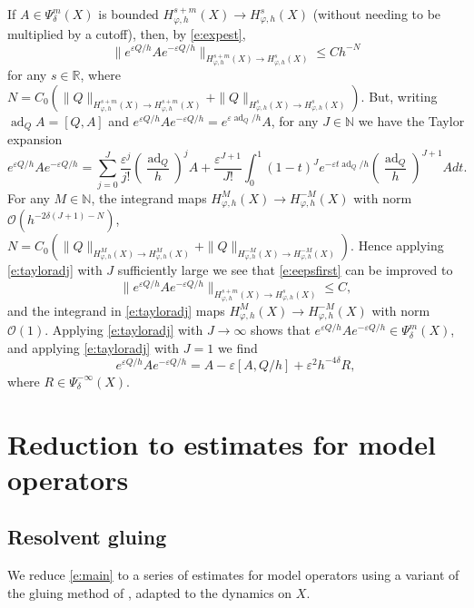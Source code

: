 \documentclass[reqno, 12pt]{amsart}
\newcommand \N {\mathbb{N}}
\newcommand \R {\mathbb{R}}
\newcommand \Oh {\mathcal{O}}
\newcommand \eps {\varepsilon}
\DeclareMathOperator \ad {ad}
\theoremstyle{definition}
\numberwithin{equation}{section}
\numberwithin{prop}{section}
\numberwithin{figure}{section}
\begin{document}
If $A \in \Psi_\delta^{m}(X)$ is bounded $H^{s+m}_{\varphi,h}(X) \to H^s_{\varphi,h}(X)$ (without needing to be multiplied by a cutoff), then, by \eqref{e:expest}, 
\begin{equation}\label{e:eepsfirst}
\|e^{\eps Q/h}A e^{-\eps Q/h}\|_{H^{s+m}_{\varphi,h}(X) \to H^s_{\varphi,h}(X)} \le C h^{-N}
\end{equation}
 for any $s \in \R$, where $N = C_0(\|Q\|_{H^{s+m}_{\varphi,h}(X) \to H^{s+m}_{\varphi,h}(X)} + \|Q\|_{H^s_{\varphi,h}(X) \to H^s_{\varphi,h}(X)})$. But, writing $\ad_Q A = [Q,A]$ and $e^{\eps Q/h}A e^{-\eps Q/h} = e^{\eps \ad_{Q}/h}A$, for any $J \in \N$ we have the Taylor expansion
\begin{equation}\label{e:tayloradj}
e^{\eps Q/h}A e^{-\eps Q/h} = \sum_{j=0}^J \frac {\eps^j}{j!} \left(\frac{\ad_{Q}}h\right)^j  A +  \frac {\eps^{J+1}}{J!}  \int_0^1(1-t)^J  e^{-\eps t\ad_{Q}/h} \left(\frac{\ad_{Q}}h\right)^{J+1} A dt.
\end{equation}
For any $M \in \N$, the integrand maps $H^{M}_{\varphi,h}(X) \to H^{-M}_{\varphi,h}(X)$ with norm $\Oh(h^{-2\delta(J+1)-N})$, $N = C_0(\|Q\|_{H^{M}_{\varphi,h}(X) \to H^{M}_{\varphi,h}(X)} + \|Q\|_{H^{-M}_{\varphi,h}(X) \to H^{-M}_{\varphi,h}(X)})$. Hence applying \eqref{e:tayloradj} with $J$ sufficiently large we see that \eqref{e:eepsfirst} can be improved to
\[
\|e^{\eps Q/h}A e^{-\eps Q/h}\|_{H^{s+m}_{\varphi,h}(X) \to H^s_{\varphi,h}(X)} \le C,
\]
and the integrand in \eqref{e:tayloradj} maps $H^{M}_{\varphi,h}(X) \to H^{-M}_{\varphi,h}(X)$ with norm $\Oh(1)$.
Applying \eqref{e:tayloradj} with $J \to \infty$ shows that $e^{\eps Q/h}A e^{-\eps Q/h} \in \Psi_\delta^m(X)$, and applying \eqref{e:tayloradj} with $J = 1$ we find
\begin{equation}\label{expexp}e^{\eps Q/h}A e^{-\eps Q/h} = A - \eps [A,Q/h] + \eps^2 h^{-4\delta} R,\end{equation}
where $R \in \Psi^{-\infty}_\delta(X)$. 

\section{Reduction to estimates for model operators}\label{s:reduce}

\subsection{Resolvent gluing}\label{s:glue} We reduce \eqref{e:main} to a series of estimates for model operators using a variant of the gluing method of \cite{Datchev-Vasy:Gluing}, adapted to the dynamics on $X$.
\end{document}
